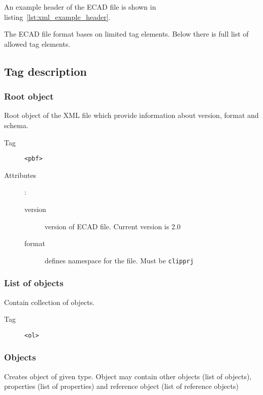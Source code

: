 \documentclass[%
	a4paper,
	oneside,
	listof=numbered,
	parskip=half,
	headsepline=true,
	footsepline=false,
	normalheadings,
	0.7headlines,
	headexclude,
	]{scrbook}
\begin{document}
An example header of the ECAD file is shown in listing~\ref{lst:xml_example_header}.



The ECAD file format bases on limited tag elements.
Below there is full list of allowed tag elements.

\subsection{Tag description}

\subsubsection{Root object}

Root object of the XML file which provide information about version, format and schema.

\begin{description}
	\item[Tag] \verb|<pbf>|
	\item[Attributes]:
	
	\begin{description}
		\item[version] version of ECAD file.
		Current version is 2.0
		\item[format] defines namespace for the file.
		Must be \verb|clipprj|
	\end{description}
\end{description}

\subsubsection{List of objects}

Contain collection of objects.

\begin{description}
	\item[Tag] \verb|<ol>|
\end{description}

\subsubsection{Objects}

Creates object of given type.
Object may contain other objects (list of objects), properties (list of properties) and reference object (list of reference objects)
\end{document}
